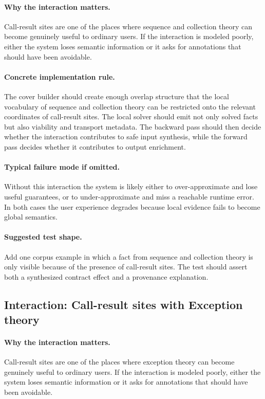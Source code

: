 \documentclass[11pt]{report}
\theoremstyle{definition}
\theoremstyle{plain}
\begin{document}
\paragraph{Why the interaction matters.}
Call-result sites are one of the places where sequence and collection theory can become
genuinely useful to ordinary users. If the interaction is modeled poorly,
either the system loses semantic information or it asks for annotations that
should have been avoidable.

\paragraph{Concrete implementation rule.}
The cover builder should create enough overlap structure that the local
vocabulary of sequence and collection theory can be restricted onto the relevant
coordinates of call-result sites. The local solver should emit not only
solved facts but also viability and transport metadata. The backward pass
should then decide whether the interaction contributes to safe input
synthesis, while the forward pass decides whether it contributes to output
enrichment.

\paragraph{Typical failure mode if omitted.}
Without this interaction the system is likely either to over-approximate and
lose useful guarantees, or to under-approximate and miss a reachable runtime
error. In both cases the user experience degrades because local evidence
fails to become global semantics.

\paragraph{Suggested test shape.}
Add one corpus example in which a fact from sequence and collection theory is only
visible because of the presence of call-result sites. The test should
assert both a synthesized contract effect and a provenance explanation.

\subsection{Interaction: Call-result sites with Exception theory}

\paragraph{Why the interaction matters.}
Call-result sites are one of the places where exception theory can become
genuinely useful to ordinary users. If the interaction is modeled poorly,
either the system loses semantic information or it asks for annotations that
should have been avoidable.
\end{document}

